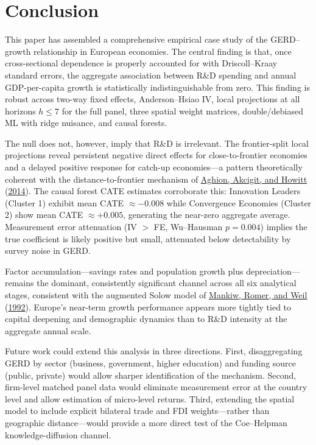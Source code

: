 \documentclass[
  11pt,
]{article}
\begin{document}
\hypertarget{sec:conclusion}{%
\section{Conclusion}\label{sec:conclusion}}

This paper has assembled a comprehensive empirical case study of the GERD--growth relationship in European economies. The central finding is that, once cross-sectional dependence is properly accounted for with Driscoll--Kraay standard errors, the aggregate association between R\&D spending and annual GDP-per-capita growth is statistically indistinguishable from zero. This finding is robust across two-way fixed effects, Anderson--Hsiao IV, local projections at all horizons \(h \leq 7\) for the full panel, three spatial weight matrices, double/debiased ML with ridge nuisance, and causal forests.

The null does not, however, imply that R\&D is irrelevant. The frontier-split local projections reveal persistent negative direct effects for close-to-frontier economies and a delayed positive response for catch-up economies---a pattern theoretically coherent with the distance-to-frontier mechanism of \protect\hyperlink{ref-aghion2014}{Aghion, Akcigit, and Howitt} (\protect\hyperlink{ref-aghion2014}{2014}). The causal forest CATE estimates corroborate this: Innovation Leaders (Cluster 1) exhibit mean CATE \(\approx -0.008\) while Convergence Economies (Cluster 2) show mean CATE \(\approx +0.005\), generating the near-zero aggregate average. Measurement error attenuation (IV \(>\) FE, Wu--Hausman \(p = 0.004\)) implies the true coefficient is likely positive but small, attenuated below detectability by survey noise in GERD.

Factor accumulation---savings rates and population growth plus depreciation---remains the dominant, consistently significant channel across all six analytical stages, consistent with the augmented Solow model of \protect\hyperlink{ref-mankiw1992}{Mankiw, Romer, and Weil} (\protect\hyperlink{ref-mankiw1992}{1992}). Europe's near-term growth performance appears more tightly tied to capital deepening and demographic dynamics than to R\&D intensity at the aggregate annual scale.

Future work could extend this analysis in three directions. First, disaggregating GERD by sector (business, government, higher education) and funding source (public, private) would allow sharper identification of the mechanism. Second, firm-level matched panel data would eliminate measurement error at the country level and allow estimation of micro-level returns. Third, extending the spatial model to include explicit bilateral trade and FDI weights---rather than geographic distance---would provide a more direct test of the Coe--Helpman knowledge-diffusion channel.
\end{document}

